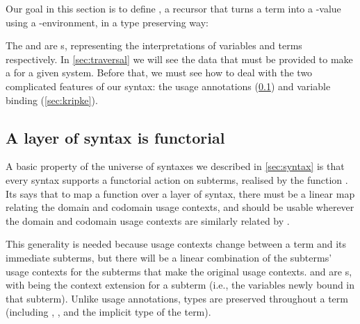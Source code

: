 Our goal in this section is to define , a
recursor that turns a term into a \AgdaBound{$\C$}-value using a
\AgdaBound{$\V$}-environment, in a type preserving way:


The \AgdaBound{$\V$} and \AgdaBound{$\C$} are s,
representing the interpretations of variables and terms
respectively. In \cref{sec:traversal} we will see the data that must
be provided to make a  for a given
system. Before that, we must see how to deal with the two complicated
features of our syntax: the usage annotations (\cref{sec:functorial})
and variable binding (\cref{sec:kripke}). 

\subsection{A layer of syntax is functorial}\label{sec:functorial}

A basic property of the universe of syntaxes we described in \cref{sec:syntax}
is that every syntax supports a functorial action on subterms, realised by the function .
Its says that to map a function 
over a layer of syntax, there must be a linear map  relating the
domain and codomain usage contexts, and  should be usable
wherever the domain and codomain usage contexts are similarly related by
.


This generality is needed because usage contexts change between
a term and its immediate subterms, but there will be a linear combination of
the subterms' usage contexts for the subterms that make the original usage contexts.
 and  are s, with
\AgdaBound{$\Theta$} being the context extension for a subterm (i.e., the
variables newly bound in that subterm).
Unlike usage annotations, types are preserved throughout a term (including
\AgdaBound{$\gamma$}, \AgdaBound{$\delta$}, and the implicit type of the term).


